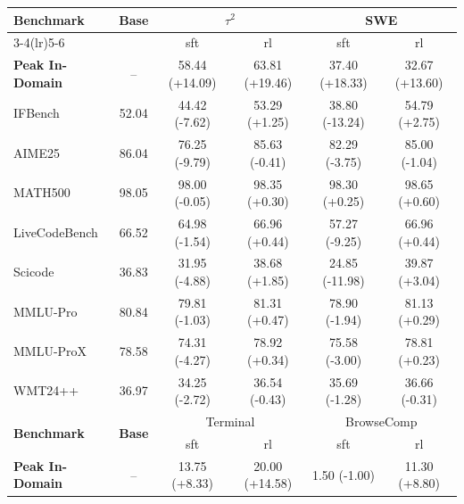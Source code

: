 \begin{table}[t]
\centering
\small
\begin{tabular}{l c cc cc}
\toprule
\multirow{2}{*}{\textbf{Benchmark}}
  & \multirow{2}{*}{\textbf{Base}}
  & \multicolumn{2}{c}{$\tau^2$}
  & \multicolumn{2}{c}{SWE} \\
\cmidrule(lr){3-4}\cmidrule(lr){5-6}
  & & sft & rl & sft & rl \\
\midrule\midrule

\textbf{Peak In-Domain} & --
  & 58.44 (+14.09) & 63.81 (+19.46)
  & 37.40 (+18.33) & 32.67 (+13.60) \\
\midrule

IFBench    & 52.04
  & 44.42 (-7.62)  & 53.29 (+1.25)
  & 38.80 (-13.24) & 54.79 (+2.75) \\
AIME25     & 86.04
  & 76.25 (-9.79)  & 85.63 (-0.41)
  & 82.29 (-3.75)  & 85.00 (-1.04) \\
MATH500    & 98.05
  & 98.00 (-0.05)  & 98.35 (+0.30)
  & 98.30 (+0.25)  & 98.65 (+0.60) \\
LiveCodeBench & 66.52
  & 64.98 (-1.54)  & 66.96 (+0.44)
  & 57.27 (-9.25)  & 66.96 (+0.44) \\
Scicode    & 36.83
  & 31.95 (-4.88)  & 38.68 (+1.85)
  & 24.85 (-11.98) & 39.87 (+3.04) \\
MMLU-Pro   & 80.84
  & 79.81 (-1.03)  & 81.31 (+0.47)
  & 78.90 (-1.94)  & 81.13 (+0.29) \\
MMLU-ProX  & 78.58
  & 74.31 (-4.27)  & 78.92 (+0.34)
  & 75.58 (-3.00)  & 78.81 (+0.23) \\
WMT24++    & 36.97
  & 34.25 (-2.72)  & 36.54 (-0.43)
  & 35.69 (-1.28)  & 36.66 (-0.31) \\

\midrule\midrule

\multirow{2}{*}{\textbf{Benchmark}}
  & \multirow{2}{*}{\textbf{Base}}
  & \multicolumn{2}{c}{Terminal}
  & \multicolumn{2}{c}{BrowseComp} \\
\cmidrule(lr){3-4}\cmidrule(lr){5-6}
  & & sft & rl & sft & rl \\
\midrule\midrule

\textbf{Peak In-Domain} & --
  & 13.75 (+8.33)  & 20.00 (+14.58)
  & 1.50 (-1.00)   & 11.30 (+8.80) \\
\midrule


\end{tabular}
\end{table}
